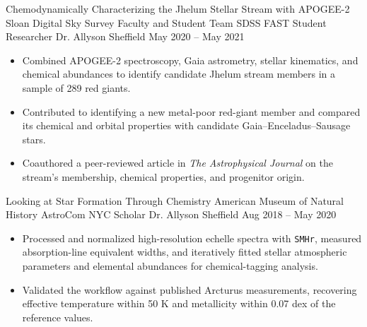 \vspace{0.4em}

\researchentry
  {Chemodynamically Characterizing the Jhelum Stellar Stream with APOGEE-2}
  {Sloan Digital Sky Survey Faculty and Student Team}
  {SDSS FAST Student Researcher}
  {Dr. Allyson Sheffield}
  {May 2020 -- May 2021}
  {%
    \hspace{0.15em}
  }

\begin{itemize}[
  leftmargin=1em,
  label={--},
  itemsep=3pt,
  topsep=0pt,
  parsep=0pt,
  partopsep=0pt
]
\item Combined APOGEE-2 spectroscopy, Gaia astrometry, stellar kinematics,
and chemical abundances to identify candidate Jhelum stream members in a
sample of 289 red giants.

\item Contributed to identifying a new metal-poor red-giant member and
compared its chemical and orbital properties with candidate
Gaia--Enceladus--Sausage stars.

\item Coauthored a peer-reviewed article in \textit{The Astrophysical Journal}
on the stream's membership, chemical properties, and progenitor origin.
\end{itemize}

\vspace{0.4em}

\researchentry
  {Looking at Star Formation Through Chemistry}
  {American Museum of Natural History}
  {AstroCom NYC Scholar}
  {Dr. Allyson Sheffield}
  {Aug 2018 -- May 2020}
  {}

\begin{itemize}[
  leftmargin=1em,
  label={--},
  itemsep=3pt,
  topsep=0pt,
  parsep=0pt,
  partopsep=0pt
]
\item Processed and normalized high-resolution echelle spectra with
\texttt{SMHr}, measured absorption-line equivalent widths, and iteratively
fitted stellar atmospheric parameters and elemental abundances for
chemical-tagging analysis.

\item Validated the workflow against published Arcturus measurements,
recovering effective temperature within 50 K and metallicity within
0.07 dex of the reference values.
\end{itemize}

\vspace{0.4em}

